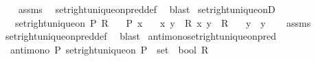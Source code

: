 \begin{isabellebody}
%
\isadelimproof
\ \ %
\endisadelimproof
%
\isatagproof
{}\isamarkupfalse%
\ assms\ \isamarkupfalse%
\ set{\isacharunderscore}{\kern0pt}right{\isacharunderscore}{\kern0pt}unique{\isacharunderscore}{\kern0pt}on{\isacharunderscore}{\kern0pt}pred{\isacharunderscore}{\kern0pt}def\ \isamarkupfalse%
\ blast%
\endisatagproof
{\isafoldproof}%
%
\isadelimproof
\isanewline
%
\endisadelimproof
\isanewline
{}\isamarkupfalse%
\ set{\isacharunderscore}{\kern0pt}right{\isacharunderscore}{\kern0pt}unique{\isacharunderscore}{\kern0pt}onD{\isacharcolon}{\kern0pt}\isanewline
\ \ \ {\isachardoublequoteopen}set{\isacharunderscore}{\kern0pt}right{\isacharunderscore}{\kern0pt}unique{\isacharunderscore}{\kern0pt}on\ P\ R{\isachardoublequoteclose}\isanewline
\ \ \ {\isachardoublequoteopen}P\ x{\isachardoublequoteclose}\isanewline
\ \ \ {\isachardoublequoteopen}{\isasymlangle}x{\isacharcomma}{\kern0pt}\ y{\isasymrangle}\ {\isasymin}\ R{\isachardoublequoteclose}\ {\isachardoublequoteopen}{\isasymlangle}x{\isacharcomma}{\kern0pt}\ y{\isacharprime}{\kern0pt}{\isasymrangle}\ {\isasymin}\ R{\isachardoublequoteclose}\isanewline
\ \ \ {\isachardoublequoteopen}y\ {\isacharequal}{\kern0pt}\ y{\isacharprime}{\kern0pt}{\isachardoublequoteclose}\isanewline
%
\isadelimproof
\ \ %
\endisadelimproof
%
\isatagproof
{}\isamarkupfalse%
\ assms\ \isamarkupfalse%
\ set{\isacharunderscore}{\kern0pt}right{\isacharunderscore}{\kern0pt}unique{\isacharunderscore}{\kern0pt}on{\isacharunderscore}{\kern0pt}pred{\isacharunderscore}{\kern0pt}def\ \isamarkupfalse%
\ blast%
\endisatagproof
{\isafoldproof}%
%
\isadelimproof
\isanewline
%
\endisadelimproof
\isanewline
{}\isamarkupfalse%
\ antimono{\isacharunderscore}{\kern0pt}set{\isacharunderscore}{\kern0pt}right{\isacharunderscore}{\kern0pt}unique{\isacharunderscore}{\kern0pt}on{\isacharunderscore}{\kern0pt}pred{\isacharcolon}{\kern0pt}\isanewline
\ \ {\isachardoublequoteopen}antimono\ {\isacharparenleft}{\kern0pt}{\isasymlambda}P{\isachardot}{\kern0pt}\ set{\isacharunderscore}{\kern0pt}right{\isacharunderscore}{\kern0pt}unique{\isacharunderscore}{\kern0pt}on\ {\isacharparenleft}{\kern0pt}P\ {\isacharcolon}{\kern0pt}{\isacharcolon}{\kern0pt}\ set\ {\isasymRightarrow}\ bool{\isacharparenright}{\kern0pt}\ R{\isacharparenright}{\kern0pt}{\isachardoublequoteclose}\isanewline
%
\isadelimproof
\ \ %
\endisadelimproof
%
\isatagproof
{}\isamarkupfalse%

\end{isabellebody}
